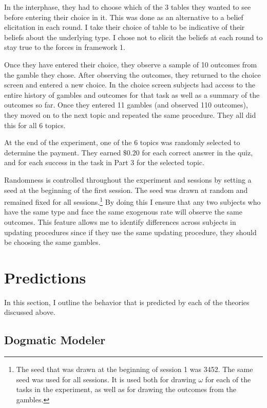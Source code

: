 \documentclass[
  12pt,
]{article}
\begin{document}
In the interphase, they had to choose which of the 3 tables they wanted
to see before entering their choice in it. This was done as an
alternative to a belief elicitation in each round. I take their choice
of table to be indicative of their beliefs about the underlying type. I
chose not to elicit the beliefs at each round to stay true to the forces
in framework 1.

Once they have entered their choice, they observe a sample of 10
outcomes from the gamble they chose. After observing the outcomes, they
returned to the choice screen and entered a new choice. In the choice
screen subjects had access to the entire history of gambles and outcomes
for that task as well as a summary of the outcomes so far. Once they
entered 11 gambles (and observed 110 outcomes), they moved on to the
next topic and repeated the same procedure. They all did this for all 6
topics.

At the end of the experiment, one of the 6 topics was randomly selected
to determine the payment. They earned \(\$0.20\) for each correct answer
in the quiz, and for each success in the task in Part 3 for the selected
topic.

Randomness is controlled throughout the experiment and sessions by
setting a seed at the beginning of the first session. The seed was drawn
at random and remained fixed for all
sessions.\footnote{The seed that was drawn 
at the beginning of session 1 was 3452. The same seed was used for all sessions. It is used both for drawing $\omega$ for each of 
the tasks in the experiment, as well as for drawing the outcomes from the gambles.}
By doing this I ensure that any two subjects who have the same type and
face the same exogenous rate will observe the same outcomes. This
feature allows me to identify differences across subjects in updating
procedures since if they use the same updating procedure, they should be
choosing the same gambles.

\hypertarget{predictions}{%
\section{Predictions}\label{predictions}}

In this section, I outline the behavior that is predicted by each of the
theories discussed above.

\hypertarget{dogmatic-modeler}{%
\subsection{Dogmatic Modeler}\label{dogmatic-modeler}}
\end{document}
